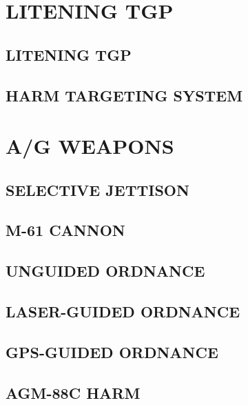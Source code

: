 \documentclass[fontInter]{TechCheck}
\begin{document}
	\cleardoublepage

	\chapter{LITENING TGP}
	\minitoc
	\cleardoublepage

	\section{LITENING TGP}

	\clearpage 

	\section{HARM TARGETING SYSTEM}

	\cleardoublepage

	\chapter{A/G WEAPONS}
	\minitoc
	\cleardoublepage

	\section{SELECTIVE JETTISON}

	\clearpage

	\section{M-61 CANNON}

	\clearpage 

	\section{UNGUIDED ORDNANCE}

	\clearpage 

	\section{LASER-GUIDED ORDNANCE}

	\clearpage 

	\section{GPS-GUIDED ORDNANCE}

	\clearpage 

	\section{AGM-88C HARM}
\end{document}
